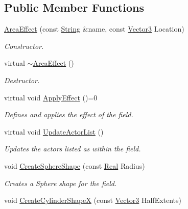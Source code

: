 \subsection*{Public Member Functions}
\begin{DoxyCompactItemize}
\item 
\hyperlink{classphys_1_1AreaEffect_af4a11385bfc07aea76d135be8a88e136}{AreaEffect} (const \hyperlink{namespacephys_aa03900411993de7fbfec4789bc1d392e}{String} \&name, const \hyperlink{classphys_1_1Vector3}{Vector3} Location)
\begin{DoxyCompactList}\small\item\em Constructor. \item\end{DoxyCompactList}\item 
virtual \hyperlink{classphys_1_1AreaEffect_aa9e6d721d337c32aa47357060d319924}{$\sim$AreaEffect} ()
\begin{DoxyCompactList}\small\item\em Destructor. \item\end{DoxyCompactList}\item 
virtual void \hyperlink{classphys_1_1AreaEffect_a3b285ecfcf9c9200662d510e48dd222a}{ApplyEffect} ()=0
\begin{DoxyCompactList}\small\item\em Defines and applies the effect of the field. \item\end{DoxyCompactList}\item 
virtual void \hyperlink{classphys_1_1AreaEffect_a0a0e6dfc6353d19b19e7bea037172072}{UpdateActorList} ()
\begin{DoxyCompactList}\small\item\em Updates the actors listed as within the field. \item\end{DoxyCompactList}\item 
void \hyperlink{classphys_1_1AreaEffect_a57399254f84ac288f74033ab609d8ffc}{CreateSphereShape} (const \hyperlink{namespacephys_af7eb897198d265b8e868f45240230d5f}{Real} Radius)
\begin{DoxyCompactList}\small\item\em Creates a Sphere shape for the field. \item\end{DoxyCompactList}\item 
void \hyperlink{classphys_1_1AreaEffect_af84235ffcec937574c389787eccdcc6f}{CreateCylinderShapeX} (const \hyperlink{classphys_1_1Vector3}{Vector3} HalfExtents)

\end{DoxyCompactItemize}
